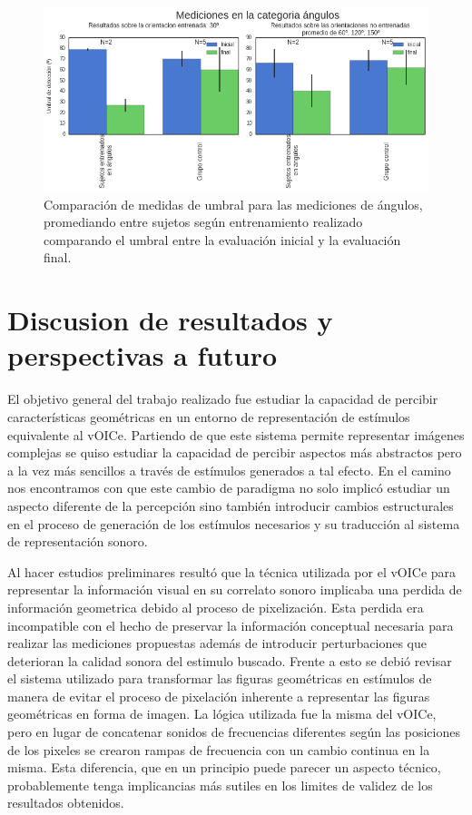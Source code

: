 \documentclass{article}
\numberwithin{figure}{section}
\begin{document}
    \begin{figure}
        \center
        \includegraphics[width=\textwidth]{Imagenes/TransferenciaAngulosBarras.png}
        \caption{Comparación de medidas de umbral para las mediciones de ángulos, promediando entre sujetos según entrenamiento realizado comparando el umbral entre la evaluación inicial y la evaluación final.}
        \label{fig:TransferenciaAngulosBarras}
    \end{figure}  
    
\section{Discusion de resultados y perspectivas a futuro}
    
    El objetivo general del trabajo realizado fue estudiar la capacidad de percibir características geométricas en un entorno de representación de estímulos equivalente al vOICe. Partiendo de que este sistema permite representar imágenes complejas se quiso estudiar la capacidad de percibir aspectos más abstractos pero a la vez más sencillos a través de estímulos generados a tal efecto. En el camino nos encontramos con que este cambio de paradigma no solo implicó estudiar un aspecto diferente de la percepción sino también introducir cambios estructurales en el proceso de generación de los estímulos necesarios y su traducción al sistema de representación sonoro. 
    
    Al hacer estudios preliminares resultó que la técnica utilizada por el vOICe para representar la información visual en su correlato sonoro implicaba una perdida de información geometrica debido al proceso de pixelización. Esta perdida era incompatible con el hecho de preservar la información conceptual necesaria para realizar las mediciones propuestas además de introducir perturbaciones que deterioran la calidad sonora del estimulo buscado. Frente a esto se debió revisar el sistema utilizado para transformar las figuras geométricas en estímulos de manera de evitar el proceso de pixelación inherente a representar las figuras geométricas en forma de imagen. La lógica utilizada fue la misma del vOICe, pero en lugar de concatenar sonidos de frecuencias diferentes según las posiciones de los pixeles se crearon rampas de frecuencia con un cambio continua en la misma. Esta diferencia, que en un principio puede parecer un aspecto técnico, probablemente tenga implicancias más sutiles en los limites de validez de los resultados obtenidos. 
    
\end{document}
